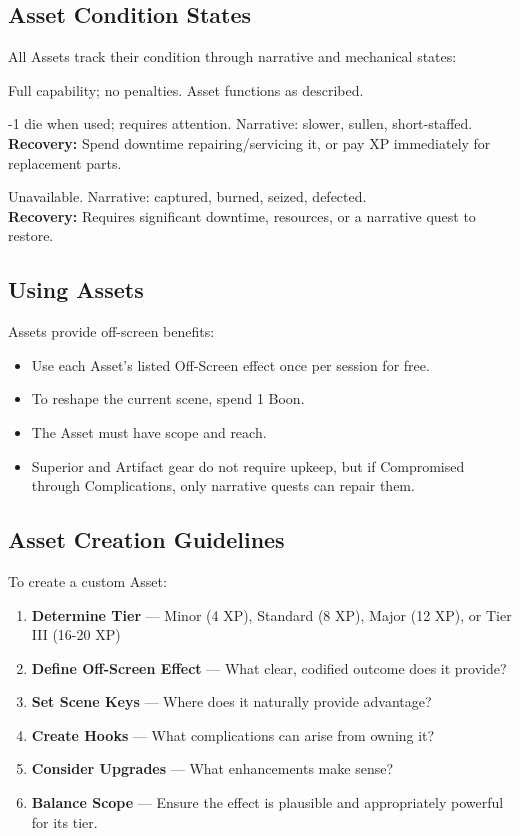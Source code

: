 \documentclass[12pt]{article}
\begin{document}
\subsection*{Asset Condition States}

All Assets track their condition through narrative and mechanical states:

\begin{description}[leftmargin=*]
  \item[\textbf{Maintained}] Full capability; no penalties. Asset functions as described.

  \item[\textbf{Neglected}] -1 die when used; requires attention. Narrative: slower, sullen, short-staffed. \\
  \textbf{Recovery:} Spend downtime repairing/servicing it, or pay XP immediately for replacement parts.

  \item[\textbf{Compromised}] Unavailable. Narrative: captured, burned, seized, defected. \\
  \textbf{Recovery:} Requires significant downtime, resources, or a narrative quest to restore.
\end{description}

\subsection*{Using Assets}

Assets provide off-screen benefits:
\begin{itemize}
  \item Use each Asset's listed Off-Screen effect once per session for free.
  \item To reshape the current scene, spend 1 Boon.
  \item The Asset must have scope and reach.
  \item Superior and Artifact gear do not require upkeep, but if Compromised through Complications, only narrative quests can repair them.
\end{itemize}

\subsection*{Asset Creation Guidelines}

To create a custom Asset:
\begin{enumerate}
  \item \textbf{Determine Tier} — Minor (4 XP), Standard (8 XP), Major (12 XP), or Tier III (16-20 XP)
  \item \textbf{Define Off-Screen Effect} — What clear, codified outcome does it provide?
  \item \textbf{Set Scene Keys} — Where does it naturally provide advantage?
  \item \textbf{Create Hooks} — What complications can arise from owning it?
  \item \textbf{Consider Upgrades} — What enhancements make sense?
  \item \textbf{Balance Scope} — Ensure the effect is plausible and appropriately powerful for its tier.
\end{enumerate}
\end{document}
